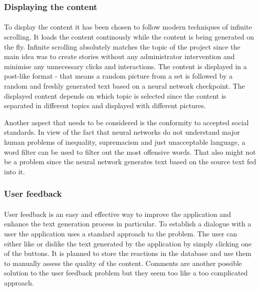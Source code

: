 \documentclass[12pt]{report}
\begin{document}
\subsubsection*{Displaying the content}
\paragraph{}
To display the content it has been chosen to follow modern techniques of infinite scrolling. It loads
the content continously while the content is being generated on the fly. Infinite scrolling absolutely matches the 
topic of the project since the main idea was to create stories without any administrator intervention and 
minimise any unnecessary clicks and interactions. The content is displayed in a post-like format - that means 
a random picture from a set is followed by a random and freshly generated text based on a neural network checkpoint.
The displayed content depends on which topic is selected since the content is separated in different topics and 
displayed with different pictures.

Another aspect that needs to be considered is the conformity to accepted social standards.
In view of the fact that neural networks do not understand major human problems of inequality, supremacism and just
unacceptable language, a word filter can be used to filter out the most offensive words. That also might not be a problem
since the neural network generates text based on the source text fed into it.


\subsubsection*{User feedback}
\paragraph{}
User feedback is an easy and effective way to improve the application and enhance the text generation process in
particular. To establish a dialogue with a user the application uses a standard approach to the problem.
The user can either like or dislike the text generated by the application by simply clicking one of the buttons. 
It is planned to store the reactions in the database and use them to manually assess the quality of the content.
Comments are another possible solution to the user feedback problem but they seem too like a too complicated
approach.
\end{document}
